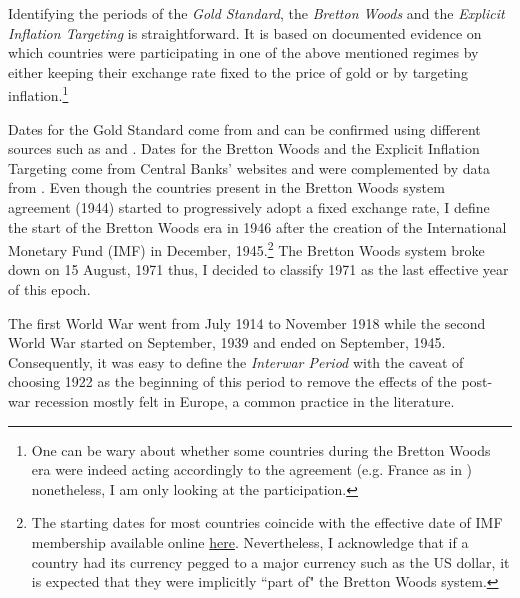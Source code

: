 \documentclass[12pt]{article}
\begin{document}
\begin{appendices}
Identifying the periods of the \textit{Gold Standard}, the \textit{Bretton Woods} and the \textit{Explicit Inflation Targeting} is straightforward. It is based on documented evidence on which countries were participating in one of the above mentioned regimes by either keeping their exchange rate fixed to the price of gold or by targeting inflation.\footnote{One can be wary about whether some countries during the Bretton Woods era were indeed acting accordingly to the agreement (e.g. France as in \cite{Bordo1995}) nonetheless, I am only looking at the participation.}

Dates for the Gold Standard come from \cite{Reinhart2009} and can be confirmed using different sources such as \cite{Bordo1996} and \cite{Diebold1991}. Dates for the Bretton Woods and the Explicit Inflation Targeting come from Central Banks' websites and were complemented by data from \cite{Ilzetzki2019}. Even though the countries present in the Bretton Woods system agreement (1944) started to progressively adopt a fixed exchange rate, I define the start of the Bretton Woods era in 1946 after the creation of the International Monetary Fund (IMF) in December, 1945.\footnote{The starting dates for most countries coincide with the effective date of IMF membership available online \href{https://www.imf.org/external/np/sec/memdir/memdate.htm}{here}. Nevertheless, I acknowledge that if a country had its currency pegged to a major currency such as the US dollar, it is expected that they were implicitly ``part of" the Bretton Woods system.} The Bretton Woods system broke down on 15 August, 1971 thus, I decided to classify 1971 as the last effective year of this epoch.

The first World War went from July 1914 to November 1918 while the second World War started on September, 1939 and ended on September, 1945. Consequently, it was easy to define the \textit{Interwar Period} with the caveat of choosing 1922 as the beginning of this period to remove the effects of the post-war recession mostly felt in Europe, a common practice in the literature.


\end{appendices}
\end{document}
